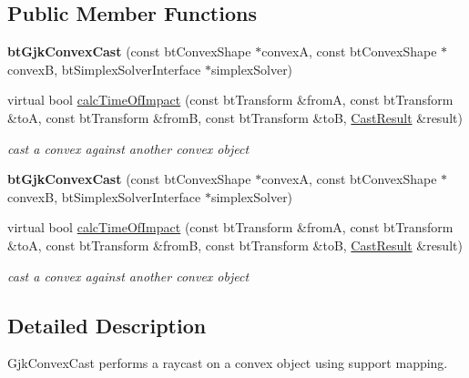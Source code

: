 \subsection*{Public Member Functions}
\begin{DoxyCompactItemize}
\item 
\mbox{\label{classbtGjkConvexCast_af06c51b46aee3ce90b0034b46897dbed}} 
{\bfseries bt\+Gjk\+Convex\+Cast} (const bt\+Convex\+Shape $\ast$convexA, const bt\+Convex\+Shape $\ast$convexB, bt\+Simplex\+Solver\+Interface $\ast$simplex\+Solver)
\item 
virtual bool \hyperlink{classbtGjkConvexCast_a814009e1ebc582495689f365a42ce2c1}{calc\+Time\+Of\+Impact} (const bt\+Transform \&fromA, const bt\+Transform \&toA, const bt\+Transform \&fromB, const bt\+Transform \&toB, \hyperlink{structbtConvexCast_1_1CastResult}{Cast\+Result} \&result)
\begin{DoxyCompactList}\small\item\em cast a convex against another convex object \end{DoxyCompactList}\item 
\mbox{\label{classbtGjkConvexCast_af06c51b46aee3ce90b0034b46897dbed}} 
{\bfseries bt\+Gjk\+Convex\+Cast} (const bt\+Convex\+Shape $\ast$convexA, const bt\+Convex\+Shape $\ast$convexB, bt\+Simplex\+Solver\+Interface $\ast$simplex\+Solver)
\item 
\mbox{\label{classbtGjkConvexCast_a761dd9248a077984ae54b7f1ad59422c}} 
virtual bool \hyperlink{classbtGjkConvexCast_a761dd9248a077984ae54b7f1ad59422c}{calc\+Time\+Of\+Impact} (const bt\+Transform \&fromA, const bt\+Transform \&toA, const bt\+Transform \&fromB, const bt\+Transform \&toB, \hyperlink{structbtConvexCast_1_1CastResult}{Cast\+Result} \&result)
\begin{DoxyCompactList}\small\item\em cast a convex against another convex object \end{DoxyCompactList}\end{DoxyCompactItemize}


\subsection{Detailed Description}
Gjk\+Convex\+Cast performs a raycast on a convex object using support mapping. 

